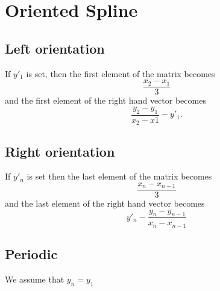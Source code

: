 \documentclass[aps]{revtex4}
\begin{document}
\section{Oriented Spline}
\subsection{Left orientation}
If $y'_1$ is set, then the first element of the matrix becomes
$$
	\dfrac{x_2-x_1}{3}
$$
and the first element of the right hand vector becomes
$$
	\dfrac{y_2-y_1}{x_2-x1} - y'_1.
$$
\subsection{Right orientation}
If $y'_n$ is set then the last element of the matrix becomes
$$
	\dfrac{x_n-x_{n-1}}{3}
$$
and the last element of the right hand vector becomes
$$
	y'_n - \dfrac{y_n-y_{n-1}}{x_n-x_{n-1}}
$$
\subsection{Periodic}
We assume that $y_n=y_1$
\end{document}
